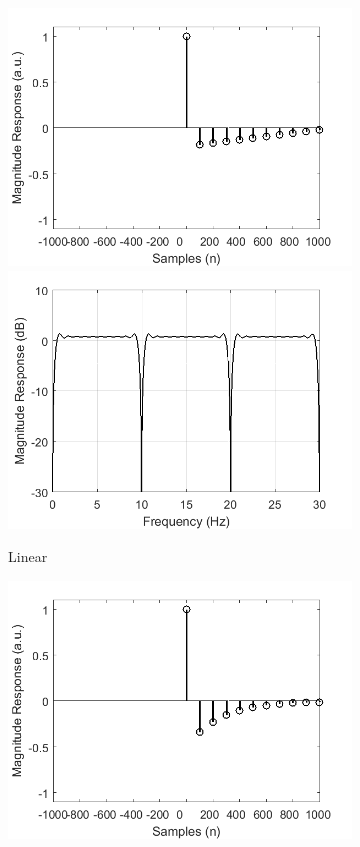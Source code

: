 \documentclass[a4paper]{article}
\begin{document}
\begin{figure}[hbtp]
\begin{subfigure}{.16\textwidth}
        \includegraphics[width=\textwidth]{img/causal/kernel_linear.png}\\
        \includegraphics[width=\textwidth]{img/causal/mag_linear.png}
        \caption{\scriptsize{Linear}}\label{fig:LinearKernel}
    \end{subfigure}
    \begin{subfigure}{.16\textwidth}
        \includegraphics[width=\textwidth]{img/causal/kernel_exp.png}\\

\end{subfigure}
\end{figure}
\end{document}
